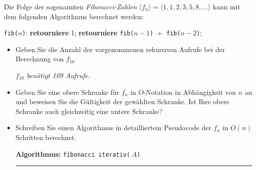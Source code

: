 \documentclass[a4paper, 12pt]{article}
\begin{document}
\ueblatt
\setcounter{angabe}{0}




\begin{angabe}
Die Folge der sogenannten \emph{Fibonacci-Zahlen}
$\langle f_n\rangle = \langle 1, 1, 2, 3, 5, 8, \ldots\rangle$ kann mit
dem folgenden Algorithmus berechnet werden:
\begin{center}
\begin{minipage}{8cm}
\begin{algorithmic}
\item[\texttt{fib(}$n$\texttt):]
	\ZEILE \textbf{retourniere} 1;
\SONST
	\ZEILE \textbf{retourniere} \texttt{fib(}$n - 1$\texttt)
		${} + {}$
		\texttt{fib(}$n - 2$\texttt);
\ENDFALLS
\end{algorithmic}
\end{minipage}
\end{center}
\begin{itemize}
\item Geben Sie die Anzahl der vorgenommenen rekursiven Aufrufe bei der
	Berechnung von $f_{10}$ 

	\textit{$f_{10}$ benötigt 109 Aufrufe.}
	
\item Geben Sie eine obere Schranke für $f_n$ in $O$-Notation in
	Abhängigkeit von $n$ an und beweisen Sie die Gültigkeit der
	gewählten Schranke. Ist Ihre obere Schranke auch gleichzeitig
	eine untere Schranke?
\item Schreiben Sie einen Algorithmus in detailliertem Pseudocode der
	$f_n$ in $O(n)$ Schritten berechnet.\newline
	

\begin{minipage}{10cm}
\textbf{Algorithmus:} \texttt{fibonacci iterativ(}$~A$\texttt)
\hrule
{}
\end{minipage}
\end{itemize}
\end{angabe}
\end{document}

